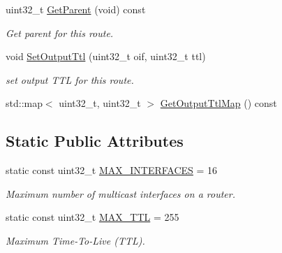 \begin{DoxyCompactItemize}
uint32\+\_\+t \hyperlink{classns3_1_1Ipv6MulticastRoute_a5d7fd8b1fe4e74ee8226158661df7e49}{Get\+Parent} (void) const 
\begin{DoxyCompactList}\small\item\em Get parent for this route. \end{DoxyCompactList}\item 
void \hyperlink{classns3_1_1Ipv6MulticastRoute_aec3dd0c8457857358304391beee90992}{Set\+Output\+Ttl} (uint32\+\_\+t oif, uint32\+\_\+t ttl)
\begin{DoxyCompactList}\small\item\em set output T\+TL for this route. \end{DoxyCompactList}\item 
std\+::map$<$ uint32\+\_\+t, uint32\+\_\+t $>$ \hyperlink{classns3_1_1Ipv6MulticastRoute_ae85fea63255a5571a23a813f59907a0f}{Get\+Output\+Ttl\+Map} () const 
\end{DoxyCompactItemize}
\subsection*{Static Public Attributes}
\begin{DoxyCompactItemize}
\item 
static const uint32\+\_\+t \hyperlink{classns3_1_1Ipv6MulticastRoute_a68fd3354b3fd460b4f95bf78d859e75b}{M\+A\+X\+\_\+\+I\+N\+T\+E\+R\+F\+A\+C\+ES} = 16
\begin{DoxyCompactList}\small\item\em Maximum number of multicast interfaces on a router. \end{DoxyCompactList}\item 
static const uint32\+\_\+t \hyperlink{classns3_1_1Ipv6MulticastRoute_a4e067c261e6c0abbeaaeb050f9b1727b}{M\+A\+X\+\_\+\+T\+TL} = 255
\begin{DoxyCompactList}\small\item\em Maximum Time-\/\+To-\/\+Live (T\+TL). \end{DoxyCompactList}\end{DoxyCompactItemize}
